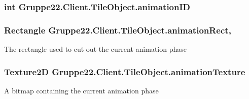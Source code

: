 \hypertarget{class_gruppe22_1_1_client_1_1_tile_object_a6ad718b3f74074c310a6530d20d0c3c9}{
\subsubsection[{animation\-I\-D}]{\setlength{\rightskip}{0pt plus 5cm}int Gruppe22.\-Client.\-Tile\-Object.\-animation\-I\-D\hspace{0.3cm}{\ttfamily [get]}}}\label{class_gruppe22_1_1_client_1_1_tile_object_a6ad718b3f74074c310a6530d20d0c3c9}
\hypertarget{class_gruppe22_1_1_client_1_1_tile_object_ad68010b4b4677968177f6d6ab0b26324}{
\subsubsection[{animation\-Rect}]{\setlength{\rightskip}{0pt plus 5cm}Rectangle Gruppe22.\-Client.\-Tile\-Object.\-animation\-Rect\hspace{0.3cm}{\ttfamily [get]}, {\ttfamily [set]}}}\label{class_gruppe22_1_1_client_1_1_tile_object_ad68010b4b4677968177f6d6ab0b26324}


The rectangle used to cut out the current animation phase 

\hypertarget{class_gruppe22_1_1_client_1_1_tile_object_a4f7a5bb65030d656eb6e5755bb4678aa}{
\subsubsection[{animation\-Texture}]{\setlength{\rightskip}{0pt plus 5cm}Texture2\-D Gruppe22.\-Client.\-Tile\-Object.\-animation\-Texture\hspace{0.3cm}{\ttfamily [get]}}}\label{class_gruppe22_1_1_client_1_1_tile_object_a4f7a5bb65030d656eb6e5755bb4678aa}


A bitmap containing the current animation phase 

